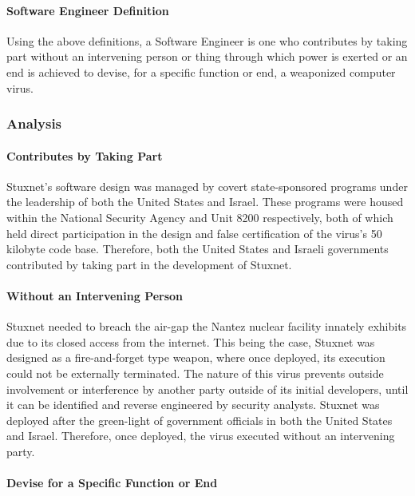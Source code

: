 \documentclass[12pt]{article}
\begin{document}
\begin{multicols}{2}
\paragraph{Software Engineer Definition}

Using the above definitions, a Software Engineer is one who contributes by taking part without an intervening person or thing through which power is exerted or an end is achieved to devise, for a specific function or end, a weaponized computer virus.

\subsubsection{Analysis}

\paragraph{Contributes by Taking Part}

Stuxnet's software design was managed by covert state-sponsored programs under the leadership of both the United States and Israel. These programs were housed within the National Security Agency and Unit 8200 respectively, both of which held direct participation in the design and false certification of the virus's 50 kilobyte code base.\cite{NationalSecurityAgencyAndUnit8200}\cite{w32.stuxnetDossier} Therefore, both the United States and Israeli governments contributed by taking part in the development of Stuxnet.

\paragraph{Without an Intervening Person}

Stuxnet needed to breach the air-gap the Nantez nuclear facility innately exhibits due to its closed access from the internet. This being the case, Stuxnet was designed as a fire-and-forget type weapon, where once deployed, its execution could not be externally terminated.\cite{stuxnetFireandForget} The nature of this virus prevents outside involvement or interference by another party outside of its initial developers, until it can be identified and reverse engineered by security analysts. Stuxnet was deployed after the green-light of government officials in both the United States and Israel. Therefore, once deployed, the virus executed without an intervening party.

\paragraph{Devise for a Specific Function or End}


\end{multicols}
\end{document}
